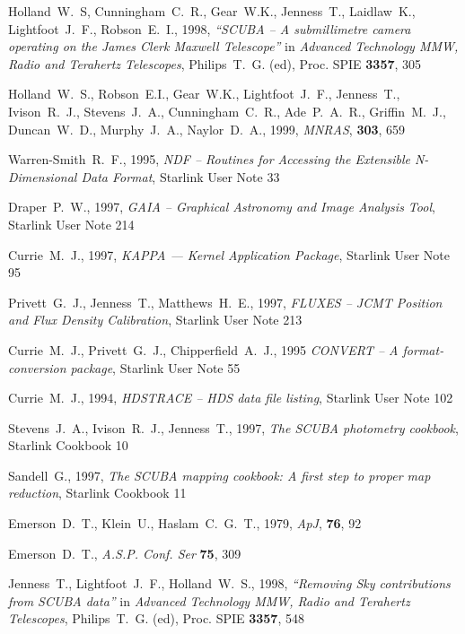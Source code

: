 \documentclass[twoside,11pt]{article}
\newcommand{\xref}[3]{#1}
\renewcommand{\_}{\texttt{\symbol{95}}}
\begin{document}
\begin{thebibliography}{}

Holland~W.~S, Cunningham~C.~R., Gear~W.K., Jenness~T., Laidlaw~K.,
Lightfoot~J.~F., Robson~E.~I., 1998, \textit{``SCUBA -- A submillimetre camera
operating on the James Clerk Maxwell Telescope''} in \textit{Advanced
Technology MMW, Radio and Terahertz Telescopes}, Philips~T.~G. (ed),
Proc. SPIE \textbf{3357}, 305

Holland~W.~S., Robson~E.I., Gear~W.K., Lightfoot~J.~F., Jenness~T.,
Ivison~R.~J., Stevens~J.~A., Cunningham~C.~R., Ade~P.~A.~R.,
Griffin~M.~J., Duncan~W.~D., Murphy~J.~A., Naylor~D.~A., 1999,
\textit{MNRAS}, \textbf{303}, 659

Warren-Smith~R.~F., 1995, {\it NDF -- Routines for Accessing the Extensible
N-Dimensional Data Format}, \xref{Starlink User Note 33}{sun33}{}

Draper~P.~W., 1997, {\it GAIA -- Graphical Astronomy and Image Analysis Tool},
\xref{Starlink User Note 214}{sun214}{}

Currie~M.~J., 1997, {\it KAPPA --- Kernel Application Package},
\xref{Starlink User Note 95}{sun95}{}

Privett~G.~J., Jenness~T., Matthews~H.~E., 1997, {\it FLUXES --
JCMT Position and Flux Density Calibration}, 
\xref{Starlink User Note 213}{sun213}{}

Currie~M.~J., Privett~G.~J., Chipperfield~A.~J., 1995 {\it CONVERT --
A format-conversion package}, \xref{Starlink User Note 55}{sun55}{}

Currie~M.~J., 1994, {\it HDSTRACE -- HDS data file listing}, 
\xref{Starlink User Note 102}{sun102}{}

Stevens~J.~A., Ivison~R.~J., Jenness~T., 1997, {\it The SCUBA photometry 
cookbook},
\xref{Starlink Cookbook 10}{sc10}{}

Sandell~G., 1997, {\it The SCUBA mapping cookbook: A first step to
proper map reduction}, \xref{Starlink Cookbook 11}{sc11}{}

Emerson~D.~T., Klein~U., Haslam~C.~G.~T., 1979, {\it ApJ}, {\bf 76}, 92

Emerson~D.~T., \textit{A.S.P. Conf. Ser} \textbf{75}, 309

Jenness~T., Lightfoot~J.~F., Holland~W.~S., 1998, 
\textit{``Removing Sky contributions from SCUBA data''} in \textit{Advanced
Technology MMW, Radio and Terahertz Telescopes}, Philips~T.~G. (ed),
Proc. SPIE \textbf{3357}, 548


\end{thebibliography}
\end{document}
